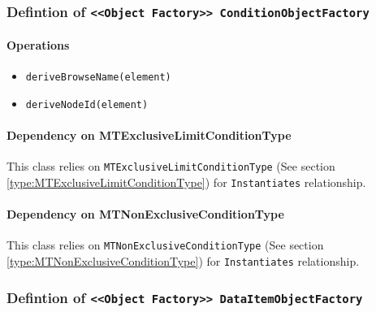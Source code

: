 \subsubsection{Defintion of \texttt{<<Object Factory>> ConditionObjectFactory}} \label{type:ConditionObjectFactory}

\FloatBarrier



\paragraph{Operations}
\begin{itemize}
  \item \texttt{deriveBrowseName(element)}
  \item \texttt{deriveNodeId(element)}
\end{itemize}
\paragraph{Dependency on MTExclusiveLimitConditionType}

This class relies on \texttt{MTExclusiveLimitConditionType} (See section \ref{type:MTExclusiveLimitConditionType}) for \texttt{Instantiates} relationship.

\paragraph{Dependency on MTNonExclusiveConditionType}

This class relies on \texttt{MTNonExclusiveConditionType} (See section \ref{type:MTNonExclusiveConditionType}) for \texttt{Instantiates} relationship.

\FloatBarrier
\subsubsection{Defintion of \texttt{<<Object Factory>> DataItemObjectFactory}} \label{type:DataItemObjectFactory}

\FloatBarrier



